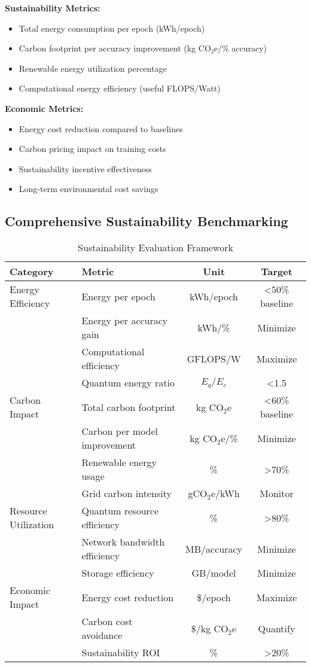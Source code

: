 \documentclass[10pt,journal,compsoc]{IEEEtran}
\begin{document}
\textbf{Sustainability Metrics:}
\begin{itemize}
\item Total energy consumption per epoch (kWh/epoch)
\item Carbon footprint per accuracy improvement (kg CO₂e/\% accuracy)
\item Renewable energy utilization percentage
\item Computational energy efficiency (useful FLOPS/Watt)
\end{itemize}

\textbf{Economic Metrics:}
\begin{itemize}
\item Energy cost reduction compared to baselines
\item Carbon pricing impact on training costs
\item Sustainability incentive effectiveness
\item Long-term environmental cost savings
\end{itemize}

\subsection{Comprehensive Sustainability Benchmarking}

\begin{table}[!t]
\centering
\caption{Sustainability Evaluation Framework}
\label{tab:sustainability_metrics}
\renewcommand{\arraystretch}{1} %
\setlength{\tabcolsep}{2pt} %
\begin{tabular}{@{}p{1.5cm}p{2.5cm}c c@{}}
\toprule
\textbf{Category} & \textbf{Metric} & \textbf{Unit} & \textbf{Target} \\
\midrule
Energy Efficiency 
& Energy per epoch & kWh/epoch & \textless 50\% baseline \\
& Energy per accuracy gain & kWh/\% & Minimize \\
& Computational efficiency & GFLOPS/W & Maximize \\
& Quantum energy ratio & $E_q/E_c$ & \textless 1.5 \\
\midrule
Carbon Impact 
& Total carbon footprint & kg CO$_2$e & \textless 60\% baseline \\
& Carbon per model improvement & kg CO$_2$e/\% & Minimize \\
& Renewable energy usage & \% & \textgreater 70\% \\
& Grid carbon intensity & gCO$_2$e/kWh & Monitor \\
\midrule
Resource Utilization 
& Quantum resource efficiency & \% & \textgreater 80\% \\
& Network bandwidth efficiency & MB/accuracy & Minimize \\
& Storage efficiency & GB/model & Minimize \\
\midrule
Economic Impact 
& Energy cost reduction & \$/epoch & Maximize \\
& Carbon cost avoidance & \$/kg CO$_2$e & Quantify \\
& Sustainability ROI & \% & \textgreater 20\% \\
\bottomrule
\end{tabular}
\end{table}
\end{document}
